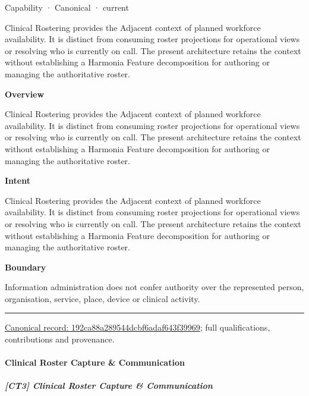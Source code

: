 \label{element:192ca88a289544dcbf6adaf643f39969}
{\small Capability · Canonical · current}\par

Clinical Rostering provides the Adjacent context of planned workforce availability. It is distinct from consuming roster projections for operational views or resolving who is currently on call. The present architecture retains the context without establishing a Harmonia Feature decomposition for authoring or managing the authoritative roster.



\textbf{Overview}



Clinical Rostering provides the Adjacent context of planned workforce availability. It is distinct from consuming roster projections for operational views or resolving who is currently on call. The present architecture retains the context without establishing a Harmonia Feature decomposition for authoring or managing the authoritative roster.



\textbf{Intent}



Clinical Rostering provides the Adjacent context of planned workforce availability. It is distinct from consuming roster projections for operational views or resolving who is currently on call. The present architecture retains the context without establishing a Harmonia Feature decomposition for authoring or managing the authoritative roster.



\textbf{Boundary}



Information administration does not confer authority over the represented person, organisation, service, place, device or clinical activity.



\medskip\hrule\medskip

{\footnotesize \href{../../../../continuum/strategy/capability/192ca88a289544dcbf6adaf643f39969.md}{Canonical record: 192ca88a289544dcbf6adaf643f39969}; full qualifications, contributions and provenance.}\par
\paragraph{Clinical Roster Capture \& Communication}

\subparagraph{[CT3] Clinical Roster Capture \& Communication}

